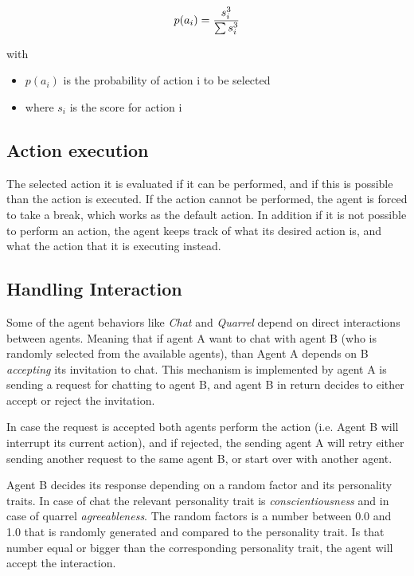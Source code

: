 \begin{equation}
    \label{eq2}
    p(a_i) = \frac{s_i^3}{\sum s_i^3} \\
\end{equation}

with
\begin{itemize}
    \item $p(a_i)$ is the probability of action i to be selected
    \item where $s_i$ is the score for action i
\end{itemize}


\subsection{Action execution}
The selected action it is evaluated if it can be performed, and if this is possible
than the action is executed. If the action cannot be performed, the agent is forced
to take a break, which works as the default action. In addition if it is not possible
to perform an action, the agent keeps track of what its desired action is, and what
the action that it is executing instead. 

\subsection{Handling Interaction}
Some of the agent behaviors like \textit{Chat} and \textit{Quarrel} depend on direct
interactions between agents. Meaning that if agent A want to chat with agent B (who is
randomly selected from the available agents), than Agent A depends on B
\textit{accepting} its invitation to chat. This mechanism is implemented
by agent A is sending a request for chatting to agent B, and agent B in return
decides to either accept or reject the invitation. 

In case the request is accepted both agents perform the action (i.e. Agent B will
interrupt its current action), and if rejected, the sending agent A will retry either
sending another request to the same agent B, or start over with another agent.

\bb

Agent B decides its response depending on a random factor and its personality traits.
In case of chat the relevant personality trait is \textit{conscientiousness} and
in case of quarrel \textit{agreeableness}. The random factors is a number between 0.0
and 1.0 that is randomly generated and compared to the personality trait.
Is that number equal or bigger than the corresponding personality trait, the agent
will accept the interaction.

